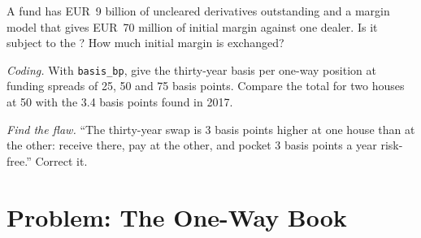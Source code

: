 \begin{exercise}[$\star\star$]\label{exo:m2:swap-clearing-and-the-ccp-basis:6}
A fund has EUR~9 billion of uncleared derivatives outstanding and a margin model
that gives EUR~70 million of initial margin against one dealer. Is it subject to
the ? How much initial margin is exchanged?
\end{exercise}

\begin{exercise}[$\star\star\star$]\label{exo:m2:swap-clearing-and-the-ccp-basis:7}
\emph{Coding.} With \texttt{basis\_bp}, give the thirty-year basis per one-way
position at funding spreads of 25, 50 and 75 basis points. Compare the total
for two houses at 50 with the 3.4 basis points found in 2017.
\end{exercise}

\begin{exercise}[$\star\star\star$]\label{exo:m2:swap-clearing-and-the-ccp-basis:8}
\emph{Find the flaw.} ``The thirty-year swap is 3 basis points higher at one
house than at the other: receive there, pay at the other, and pocket 3 basis
points a year risk-free.'' Correct it.
\end{exercise}

\section{Problem: The One-Way Book}

